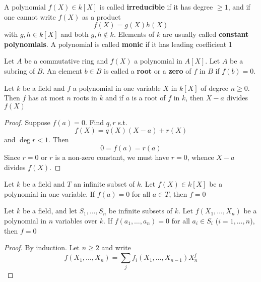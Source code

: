 \documentclass[11pt]{article}
\begin{document}
A polynomial \(f(X)\in k[X]\) is called \textbf{irreducible} if it has degree \(\ge 1\), and if one cannot
write \(f(X)\) as a product
\begin{equation*}
f(X)=g(X)h(X)
\end{equation*}
with \(g,h\in k[X]\) and both \(g,h\not\in k\). Elements of \(k\) are usually called \textbf{constant
polynomials}. A polynomial is called \textbf{monic} if it has leading coefficient 1

Let \(A\) be a commutative ring and \(f(X)\) a polynomial in \(A[X]\). Let \(A\) be
a subring of \(B\). An element \(b\in B\) is called a \textbf{root} or a \textbf{zero} of \(f\) in \(B\)
if \(f(b)=0\).

\begin{theorem}[]
Let \(k\) be a field and \(f\) a polynomial in one variable \(X\) in \(k[X]\) of degree \(n\ge 0\).
Then \(f\) has at most \(n\) roots in \(k\) and if \(a\) is a root of \(f\) in \(k\),
then \(X-a\) divides \(f(X)\)
\end{theorem}

\begin{proof}
Suppose \(f(a)=0\). Find \(q,r\) s.t.
\begin{equation*}
f(X)=q(X)(X-a)+r(X)
\end{equation*}
and \(\deg r<1\). Then
\begin{equation*}
0=f(a)=r(a)
\end{equation*}
Since \(r=0\) or \(r\) is a non-zero constant, we must have \(r=0\), whence \(X-a\)
divides \(f(X)\).
\end{proof}

\begin{corollary}[]
Let \(k\) be a field and \(T\) an infinite subset of \(k\). Let \(f(X)\in k[X]\) be a polynomial in
one variable. If \(f(a)=0\) for all \(a\in T\), then \(f=0\)
\end{corollary}

\begin{corollary}[]
Let \(k\) be a field, and let \(S_1,\dots,S_n\) be infinite subsets of \(k\). Let \(f(X_1,\dots,X_n)\) be a
polynomial in \(n\) variables over \(k\). If \(f(a_1,\dots,a_n)=0\) for all \(a_i\in S_i\) (\(i=1,\dots,n\)),
then \(f=0\)
\end{corollary}

\begin{proof}
By induction. Let \(n\ge 2\) and write
\begin{equation*}
f(X_1,\dots,X_n)=\sum_jf_i(X_1,\dots,X_{n-1})X^j_n
\end{equation*}
\end{proof}
\end{document}
